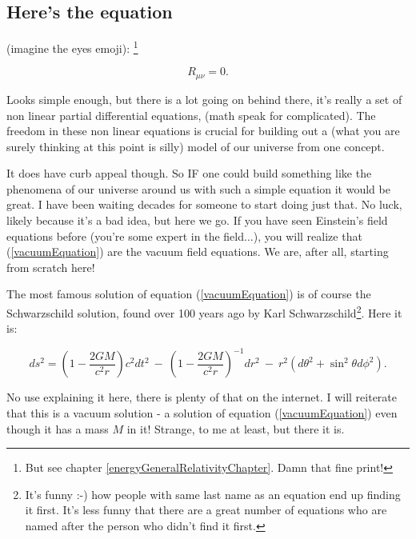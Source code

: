 \documentclass[../rzero]{subfiles}
\begin{document}
\subsection{Here's the equation}

	(imagine the eyes emoji): \footnote{But see chapter \ref{energyGeneralRelativityChapter}. Damn that fine print!} 
	

\begin{equation}\label{vacuumEquation} 
R_{\mu\nu} = 0 .  
\end{equation}

Looks simple enough, but there is a lot going on behind there, it's really a set of non linear partial differential equations, (math speak for complicated). The freedom in these non linear equations is crucial for building out a (what you are surely thinking at this point is silly) model of our universe from one concept. 

It does have curb appeal though. So IF one could build something like the phenomena of our universe around us with such a simple equation it would be great. I have been waiting decades for someone to start doing just that. No luck, likely because it's a bad idea, but here we go. If you have seen Einstein's field equations before (you're some expert in the field$\ldots$), you will realize that (\ref{vacuumEquation}) are the vacuum field equations. We are, after all, starting from scratch here!

The most famous solution of equation (\ref{vacuumEquation}) is of course the Schwarzschild solution, found over 100 years ago by Karl Schwarzschild\footnote{It's funny :-) how people with same last name as an equation end up finding it first. It's less funny that there are a great number of equations who are named after the person who didn't find it first.}\cite{schwarzschildGravitationalFieldMass1999}. Here it is:

\begin{equation}
	d s^2=\left(1-\frac{2 G M}{c^2 r}\right) c^2 d t^2\ -\ \left(1-\frac{2 G M}{c^2 r}\right)^{-1} d r^2\ -\ r^2\left(d \theta^2+\sin ^2 \theta d \phi^2\right) .
\end{equation}

No use explaining it here, there is plenty of that on the internet. I will reiterate that this is a vacuum solution - a solution of equation (\ref{vacuumEquation}) even though it has a mass $M$ in it! Strange, to me at least, but there it is.
\end{document}

